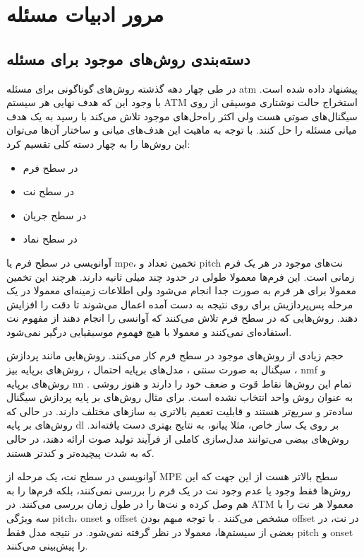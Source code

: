 \chapter{مرور ادبیات مسئله}
\section{دسته‌بندی روش‌های موجود برای مسئله}
در طی چهار دهه گذشته روش‌های گوناگونی برای مسئله \gls{atm} پیشنهاد داده شده است.
با وجود این که هدف نهایی هر سیستم \gls{ATM} استخراج حالت نوشتاری موسیقی از روی
سیگنال‌های صوتی هست ولی اکثر راه‌حل‌های موجود تلاش می‌کند با رسید به یک هدف
میانی مسئله را حل کنند. با توجه به ماهیت این هدف‌های میانی و ساختار آن‌ها
می‌توان این روش‌ها را به چهار دسته کلی تقسیم کرد:
\begin{itemize}
    \item در سطح فرم
    \item در سطح نت
    \item در سطح جریان
    \item در سطح نماد
\end{itemize}

آوانویسی در سطح فرم یا \gls{mpe}، تخمین تعداد و \gls{pitch} نت‌های موجود در هر
یک فرم زمانی است. این فرم‌ها معمولا طولی در حدود چند میلی ثانیه دارند. هرچند این
تخمین معمولا برای هر فرم به صورت جدا انجام می‌شود ولی اطلاعات زمینه‌ای معمولا در
یک مرحله‌ پس‌پردازیش برای روی نتیجه به دست آمده اعمال می‌شوند تا دقت را افزایش
دهند. روش‌هایی که در سطح فرم تلاش می‌کنند که آوانسی را انجام دهند از مفهوم نت
استفاده‌ای نمی‌کنند و معمولا با هیچ فهموم موسیقیایی درگیر نمی‌شود.

حجم زیادی از روش‌های موجود در سطح فرم کار می‌کنند. روش‌هایی مانند پردازش سیگنال
به صورت سنتی \cite{emiya2009multipitch,su2015combining}، مدل‌های برپایه احتمال
\cite{duan2010multiple}، روش‌های برپایه بیز \cite{peeling2009generative}، \gls{nmf}
\cite{smaragdis2003non,vincent2009adaptive,benetos2013automatic,fuentes2013harmonic}
و روش‌های برپایه \gls{nn} \cite{sigtia2016end,kelz2016potential}. تمام این
روش‌ها نقاط قوت و ضعف خود را دارند و هنوز روشی به عنوان روش واحد انتخاب نشده
است. برای مثال روش‌های بر پایه پردازش سیگنال ساده‌تر و سریع‌تر هستند و قابلیت
تعمیم بالاتری به سازهای مختلف دارند. در حالی که روش‌های بر پایه \gls{dl} بر روی
یک ساز خاص، مثلا پیانو، به نتایج بهتری دست یافته‌اند. روش‌های بیضی می‌توانند
مدل‌سازی کاملی از فرآیند تولید صوت ارائه دهند، در حالی که به شدت پیچیده‌تر و
کندتر هستند.

آوانویسی در سطح نت، یک مرحله از \gls{MPE} سطح بالاتر هست از این جهت که این
روش‌ها فقط وجود یا عدم وجود نت در یک فرم را بررسی نمی‌کنند، بلکه فرم‌ها را به هم
وصل کرده و نت‌ها را در طول زمان بررسی می‌کنند. در \gls{ATM} معمولا هر نت را با
سه ویژگی \gls{pitch}، onset و offset مشخص می‌کنند \cite{klapuri2007signal}. با
توجه مبهم بودن offset در نت، در بعضی از سیستم‌ها، معمولا در نظر گرفته نمی‌شود.
در نتیجه مدل فقط \gls{pitch} و onset را پیش‌بینی می‌کنند.

